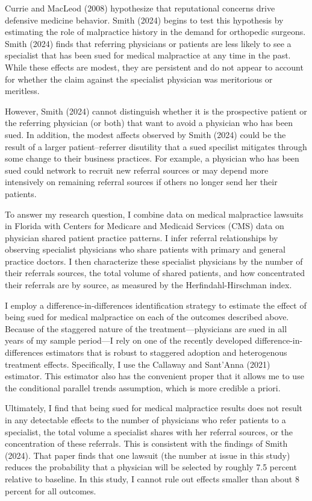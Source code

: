 \documentclass[
  12pt,
]{article}
\begin{document}
Currie and MacLeod (2008) hypothesize that reputational concerns drive defensive medicine behavior. Smith (2024) begins to test this hypothesis by estimating the role of malpractice history in the demand for orthopedic surgeons. Smith (2024) finds that referring physicians or patients are less likely to see a specialist that has been sued for medical malpractice at any time in the past. While these effects are modest, they are persistent and do not appear to account for whether the claim against the specialist physician was meritorious or meritless.

However, Smith (2024) cannot distinguish whether it is the prospective patient or the referring physician (or both) that want to avoid a physician who has been sued. In addition, the modest affects observed by Smith (2024) could be the result of a larger patient--referrer disutility that a sued specilist mitigates through some change to their business practices. For example, a physician who has been sued could network to recruit new referral sources or may depend more intensively on remaining referral sources if others no longer send her their patients.

To answer my research question, I combine data on medical malpractice lawsuits in Florida with Centers for Medicare and Medicaid Services (CMS) data on physician shared patient practice patterns. I infer referral relationships by observing specialist physicians who share patients with primary and general practice doctors. I then characterize these specialist physicians by the number of their referrals sources, the total volume of shared patients, and how concentrated their referrals are by source, as measured by the Herfindahl-Hirschman index.

I employ a difference-in-differences identification strategy to estimate the effect of being sued for medical malpractice on each of the outcomes described above. Because of the staggered nature of the treatment---physicians are sued in all years of my sample period---I rely on one of the recently developed difference-in-differences estimators that is robust to staggered adoption and heterogenous treatment effects. Specifically, I use the Callaway and Sant'Anna (2021) estimator. This estimator also has the convenient proper that it allows me to use the conditional parallel trends assumption, which is more credible a priori.

Ultimately, I find that being sued for medical malpractice results does not result in any detectable effects to the number of physicians who refer patients to a specialist, the total volume a specialist shares with her referral sources, or the concentration of these referrals. This is consistent with the findings of Smith (2024). That paper finds that one lawsuit (the number at issue in this study) reduces the probability that a physician will be selected by roughly 7.5 percent relative to baseline. In this study, I cannot rule out effects smaller than about 8 percent for all outcomes.
\end{document}
